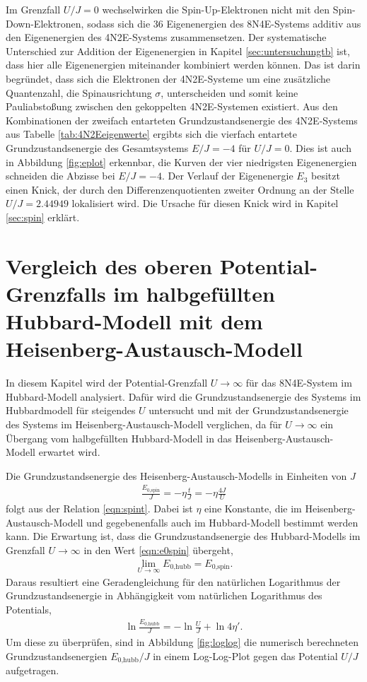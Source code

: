 Im Grenzfall $U/J = 0$ wechselwirken die Spin-Up-Elektronen nicht mit den Spin-Down-Elektronen, sodass sich die 36 Eigenenergien des 8N4E-Systems additiv aus den
Eigenenergien des 4N2E-Systems zusammensetzen. Der systematische Unterschied zur Addition der Eigenenergien in Kapitel \ref{sec:untersuchungtb} ist, dass hier alle
Eigenenergien miteinander kombiniert werden können. Das ist darin begründet, dass sich die Elektronen der 4N2E-Systeme um eine zusätzliche Quantenzahl,
die Spinausrichtung $\sigma$, unterscheiden und somit keine Pauliabstoßung zwischen den gekoppelten 4N2E-Systemen existiert.
Aus den Kombinationen der zweifach entarteten Grundzustandsenergie des 4N2E-Systems aus Tabelle \ref{tab:4N2Eeigenwerte} ergibts sich die vierfach entartete Grundzustandsenergie des Gesamtsystems $E/J = -4$ für $U/J = 0$.
Dies ist auch in Abbildung \ref{fig:eplot} erkennbar, die Kurven der vier niedrigsten Eigenenergien schneiden die Abzisse bei $E/J = -4$.
Der Verlauf der Eigenenergie $E_3$ besitzt einen Knick, der durch den Differenzenquotienten zweiter Ordnung an der Stelle $U/J = 2.44949$ lokalisiert wird.
Die Ursache für diesen Knick wird in Kapitel \ref{sec:spin} erklärt.

\section{Vergleich des oberen Potential-Grenzfalls im halbgefüllten Hubbard-Modell mit dem Heisenberg-Austausch-Modell}

In diesem Kapitel wird der Potential-Grenzfall $U\to\infty$ für das 8N4E-System im Hubbard-Modell analysiert. Dafür wird die Grundzustandsenergie des Systems im Hubbardmodell für steigendes $U$ untersucht und mit der Grundzustandsenergie des Systems im Heisenberg-Austausch-Modell
verglichen, da für $U\to\infty$ ein Übergang vom halbgefüllten Hubbard-Modell in das Heisenberg-Austausch-Modell erwartet wird.

Die Grundzustandsenergie des Heisenberg-Austausch-Modells in Einheiten von $J$
\begin{align}
  \frac{E_\text{0,spin}}{J} = - \eta \frac{t}{J} = - \eta \frac{4J}{U}
  \label{eqn:e0spin}
\end{align}
folgt aus der Relation \eqref{eqn:spint}. Dabei ist $\eta$ eine Konstante, die im Heisenberg-Austausch-Modell und gegebenenfalls auch im Hubbard-Modell bestimmt werden kann.
Die Erwartung ist, dass die Grundzustandsenergie des Hubbard-Modells im Grenzfall $U \to \infty$ in den Wert \eqref{eqn:e0spin} übergeht,
\begin{align}
  \lim\limits_{U \to \infty} E_\text{0,hubb} = E_\text{0,spin}.
\end{align}
Daraus resultiert eine Geradengleichung für den natürlichen Logarithmus der Grundzustandsenergie in Abhängigkeit vom natürlichen Logarithmus des Potentials,
\begin{align}
  \ln{\frac{E_\text{0,hubb}}{J}} = -\ln{\frac{U}{J}} + \ln{4 \eta'}.
  \label{eqn:loge0hubb}
\end{align}
Um diese zu überprüfen, sind in Abbildung \ref{fig:loglog} die numerisch berechneten Grundzustandsenergien $E_\text{0,hubb}/J$ in einem Log-Log-Plot gegen das Potential $U/J$ aufgetragen.

